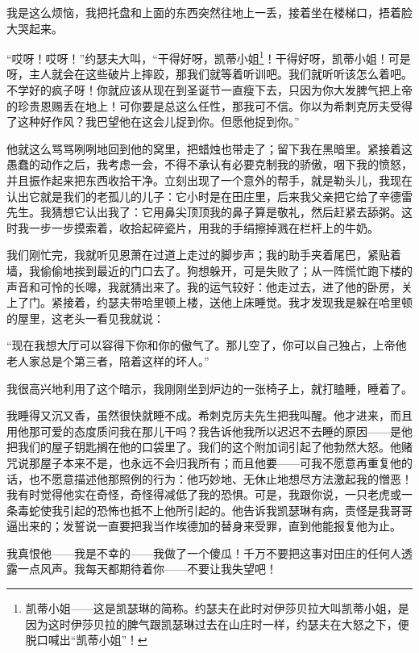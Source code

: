 {    \par 我是这么烦恼，我把托盘和上面的东西突然往地上一丢，接着坐在楼梯口，捂着脸大哭起来。
    \par “哎呀！哎呀！”约瑟夫大叫，“干得好呀，凯蒂小姐\footnote{凯蒂小姐——这是凯瑟琳的简称。约瑟夫在此时对伊莎贝拉大叫凯蒂小姐，是因为这时伊莎贝拉的脾气跟凯瑟琳过去在山庄时一样，约瑟夫在大怒之下，便脱口喊出“凯蒂小姐”！}！干得好呀，凯蒂小姐！可是呀，主人就会在这些破片上摔跤，那我们就等着听训吧。我们就听听该怎么着吧。不学好的疯子呀！你就应该从现在到圣诞节一直瘦下去，只因为你大发脾气把上帝的珍贵恩赐丢在地上！可你要是总这么任性，那我可不信。你以为希刺克厉夫受得了这种好作风？我巴望他在这会儿捉到你。但愿他捉到你。”
    \par 他就这么骂骂咧咧地回到他的窝里，把蜡烛也带走了；留下我在黑暗里。紧接着这愚蠢的动作之后，我考虑一会，不得不承认有必要克制我的骄傲，咽下我的愤怒，并且振作起来把东西收拾干净。立刻出现了一个意外的帮手，就是勒头儿，我现在认出它就是我们的老孤儿的儿子：它小时是在田庄里，后来我父亲把它给了辛德雷先生。我猜想它认出我了：它用鼻尖顶顶我的鼻子算是敬礼，然后赶紧去舔粥。这时我一步一步摸索着，收拾起碎瓷片，用我的手绢擦掉溅在栏杆上的牛奶。
    \par 我们刚忙完，我就听见恩萧在过道上走过的脚步声；我的助手夹着尾巴，紧贴着墙，我偷偷地挨到最近的门口去了。狗想躲开，可是失败了；从一阵慌忙跑下楼的声音和可怜的长嗥，我就猜出来了。我的运气较好：他走过去，进了他的卧房，关上了门。紧接着，约瑟夫带哈里顿上楼，送他上床睡觉。我才发现我是躲在哈里顿的屋里，这老头一看见我就说：
    \par “现在我想大厅可以容得下你和你的傲气了。那儿空了，你可以自己独占，上帝他老人家总是个第三者，陪着这样的坏人。”
    \par 我很高兴地利用了这个暗示，我刚刚坐到炉边的一张椅子上，就打瞌睡，睡着了。
    \par 我睡得又沉又香，虽然很快就睡不成。希刺克厉夫先生把我叫醒。他才进来，而且用他那可爱的态度质问我在那儿干吗？我告诉他我所以迟迟不去睡的原因——是他把我们的屋子钥匙搁在他的口袋里了。我们的这个附加词引起了他勃然大怒。他赌咒说那屋子本来不是，也永远不会归我所有；而且他要——可我不愿意再重复他的话，也不愿意描述他那照例的行为：他巧妙地、无休止地想尽方法激起我的憎恶！我有时觉得他实在奇怪，奇怪得减低了我的恐惧。可是，我跟你说，一只老虎或一条毒蛇使我引起的恐怖也抵不上他所引起的。他告诉我凯瑟琳有病，责怪是我哥哥逼出来的；发誓说一直要把我当作埃德加的替身来受罪，直到他能报复他为止。
    \par 我真恨他——我是不幸的——我做了一个傻瓜！千万不要把这事对田庄的任何人透露一点风声。我每天都期待着你——不要让我失望吧！
    \par {}
}



